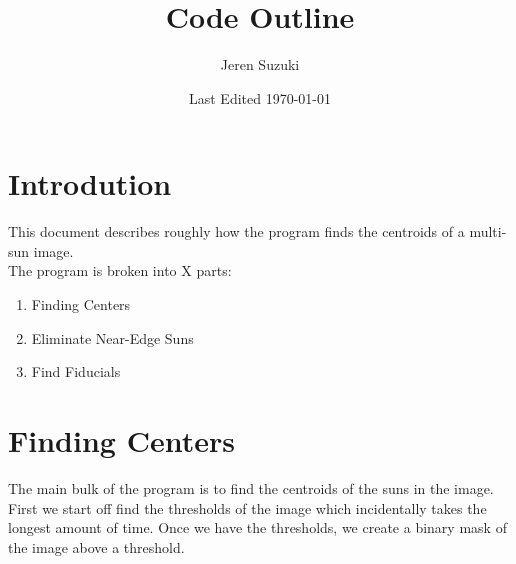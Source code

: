 \documentclass[10pt]{scrartcl}
\title{Code Outline}
\author{Jeren Suzuki}
\date{Last Edited \today}
\begin{document}
\maketitle
{}
\tableofcontents
\clearpage
{}

\section{Introdution} %
\label{sec:introdution}
This document describes roughly how the program finds the centroids of a multi-sun image.\\

The program is broken into X parts:

\begin{enumerate}
    \item Finding Centers
    \item Eliminate Near-Edge Suns
    \item Find Fiducials
\end{enumerate}

\section{Finding Centers} %
\label{sec:finding_centers}
    The main bulk of the program is to find the centroids of the suns in the image. First we start off find the thresholds of the image which incidentally takes the longest amount of time. Once we have the thresholds, we create a binary mask of the image above a threshold. 
\\
\end{document}
